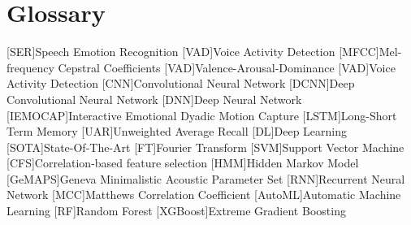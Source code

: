 \chapter{Glossary}

\footnotesize
\SingleSpacing

\begin{multicols}{2}
\begin{acronym}[AAAAAA]

    [SER]{Speech Emotion Recognition}
    [VAD]{Voice Activity Detection}
    [MFCC]{Mel-frequency Cepstral Coefficients}
    [VAD]{Valence-Arousal-Dominance}
    [VAD]{Voice Activity Detection}
    [CNN]{Convolutional Neural Network}
    [DCNN]{Deep Convolutional Neural Network}
    [DNN]{Deep Neural Network}
    [IEMOCAP]{Interactive Emotional Dyadic Motion Capture}
    [LSTM]{Long-Short Term Memory}
    [UAR]{Unweighted Average Recall}
    [DL]{Deep Learning}
    [SOTA]{State-Of-The-Art}
    [FT]{Fourier Transform}
    [SVM]{Support Vector Machine}
    [CFS]{Correlation-based feature selection}
    [HMM]{Hidden Markov Model}
    [GeMAPS]{Geneva Minimalistic Acoustic Parameter Set}
    [RNN]{Recurrent Neural Network}
    [MCC]{Matthews Correlation Coefficient}
    [AutoML]{Automatic Machine Learning}
    [RF]{Random Forest}
    [XGBoost]{Extreme Gradient Boosting}
\end{acronym}
\end{multicols}

